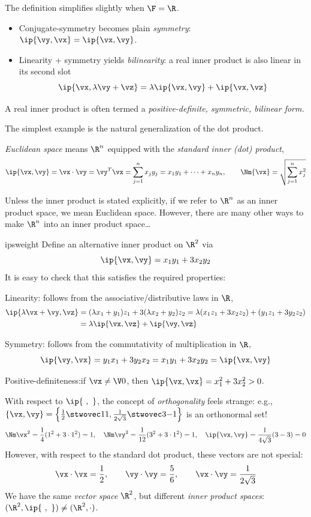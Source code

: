 
The definition simplifies slightly when $\F=\R$.
\begin{itemize}
  \item Conjugate-symmetry becomes plain \emph{symmetry}: $\ip{\vy,\vx}=\ip{\vx,\vy}$.
  \item Linearity $+$ symmetry yields \emph{bilinearity}: a real inner product is also linear in its second slot
  \[\ip{\vx,\lambda\vy+\vz}=\lambda\ip{\vx,\vy}+\ip{\vx,\vz}\]
\end{itemize}
A real inner product is often termed a \emph{positive-definite, symmetric, bilinear form.}\medbreak

The simplest example is the natural generalization of the dot product.

\begin{defn}{}{}
\emph{Euclidean space} means $\R^n$ equipped with the \emph{standard inner (dot) product},
\[\ip{\vx,\vy} =\vx\cdot\vy=\vy^T\vx=\sum_{j=1}^nx_jy_j=x_1y_1+\cdots+x_ny_n,\qquad \Nm{\vx}=\sqrt{\sum_{j=1}^nx_j^2}\]
\end{defn}

Unless the inner product is stated explicitly, if we refer to $\R^n$ as an inner product space, we mean Euclidean space. However, there are many other ways to make $\R^n$ into an inner product space\ldots
\goodbreak

\begin{example}{}{ipsweight}
Define an alternative inner product on $\R^2$ via
	\[\ip{\vx,\vy}=x_1y_1+3x_2y_2\]
	It is easy to check that this satisfies the required properties: 
	\begin{enumeratea}
  	\item Linearity: follows from the associative/distributive laws in $\R$,
  	\begin{align*}
  		\ip{\lambda\vx+\vy,\vz}&=(\lambda x_1+y_1)z_1+3(\lambda x_2+y_2)z_2
  		=\lambda(x_1z_1+3x_2z_2)+(y_1z_1+3y_2z_2)\\
  		&=\lambda\ip{\vx,\vz}+\ip{\vy,\vz}
  	\end{align*}
  	\item Symmetry: follows from the commutativity of multiplication in $\R$,
  	\[\ip{\vy,\vx}=y_1x_1+3y_2x_2=x_1y_1+3x_2y_2=\ip{\vx,\vy}\]
		\item Positive-definiteness:\quad if $\vx\neq\V0$, then $\ip{\vx,\vx}=x_1^2+3x_2^2>0$.
	\end{enumeratea}
	With respect to $\ip{\ ,\ }$, the concept of \emph{orthogonality} feels strange: e.g., $\{\vx,\vy\}=\left\{\frac 12\stwovec 11,\frac 1{2\sqrt{3}}\stwovec 3{-1}\right\}$ is an orthonormal set!
  \[
  	\Nm\vx^2=\frac 14(1^2+3\cdot 1^2)=1,\quad \Nm\vy^2=\frac 1{12}(3^2+3\cdot 1^2)=1,\quad \ip{\vx,\vy}=\frac 1{4\sqrt 3}(3-3)=0
  \]
	However, with respect to the standard dot product, these vectors are not special:
  \[\vx\cdot\vx=\frac 12,\qquad \vy\cdot\vy=\frac 56,\qquad \vx\cdot \vy=\frac 1{2\sqrt 3}\]
  We have the same \emph{vector space} $\R^2$, but different \emph{inner product spaces}: $(\R^2,\ip{\ ,\ })\neq (\R^2,\cdot)$.
\end{example}

